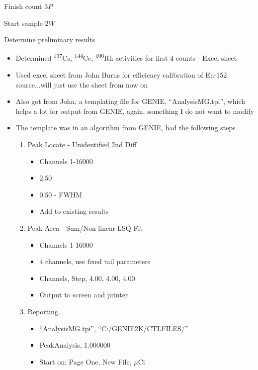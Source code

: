 \documentclass[idxtotoc,hyperref,openany,oneside]{labbook} %
\newcommand{\cmark}{\ding{51}}%
\newcommand{\done}{\rlap{$\square$}{\raisebox{2pt}{\large\hspace{1pt}\cmark}}%
  \hspace{-2.5pt}}
\newcommand{\tss}{\textsuperscript}
\begin{document}

\begin{todolist}
\item[\done]{Finish count $\boxed{3P}$}
\item[\done]{Start sample $\boxed{2W}$}
\item[\done]{Determine preliminary results}
  \begin{itemize}
  \item{Determined \tss{137}Cs, \tss{144}Ce, \tss{106}Rh
    activities for first 4 counts - Excel sheet}
  \item{Used excel sheet from John Burns for efficiency
    calibration of Eu-152 source...will just use
    the sheet from now on}
  \item{Also got from John, a templating file for GENIE,
    ``AnalysisMG.tpi'', which helps a lot for output from
    GENIE, again, something I do not want to modify}
  \item{The template was in an algorithm from GENIE, had
    the following steps}
    \begin{enumerate}
    \item{Peak Locate - Unidentified 2nd Diff}
      \begin{itemize}
      \item{Channels 1-16000}
      \item{2.50}
      \item{0.50 - FWHM}
      \item{Add to existing results}
      \end{itemize}
    \item{Peak Area - Sum/Non-linear LSQ Fit}
      \begin{itemize}
      \item{Channels 1-16000}
      \item{4 channels, use fixed tail parameters}
      \item{Channels, Step, 4.00, 4.00, 4.00}
      \item{Output to screen and printer}
      \end{itemize}
    \item{Reporting...}
      \begin{itemize}
      \item{``AnalysisMG.tpi'', ``C:/GENIE2K/CTLFILES/''}
      \item{PeakAnalysis, 1.000000}
      \item{Start on: Page One, New File, $\mu$Ci}
      \end{itemize}

\end{enumerate}
\end{itemize}
\end{todolist}
\end{document}
